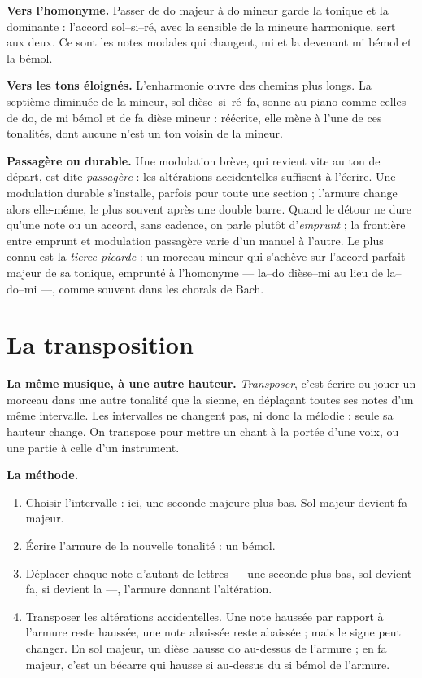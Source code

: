 \documentclass[a4paper,11pt]{article}
\begin{document}
\textbf{Vers l'homonyme.} Passer de do majeur à do mineur garde la tonique et
la dominante : l'accord sol--si--ré, avec la sensible de la mineure
harmonique, sert aux deux. Ce sont les notes modales qui changent, mi et la
devenant mi bémol et la bémol.

\textbf{Vers les tons éloignés.} L'enharmonie ouvre des chemins plus longs.
La septième diminuée de la mineur, sol dièse--si--ré--fa, sonne au piano comme
celles de do, de mi bémol et de fa dièse mineur : réécrite, elle mène à l'une
de ces tonalités, dont aucune n'est un ton voisin de la mineur.

\textbf{Passagère ou durable.} Une modulation brève, qui revient vite au ton
de départ, est dite \emph{passagère} : les altérations accidentelles suffisent
à l'écrire. Une modulation durable s'installe, parfois pour toute une section ;
l'armure change alors elle-même, le plus souvent après une double barre. Quand
le détour ne dure qu'une note ou un accord, sans cadence, on parle plutôt
d'\emph{emprunt} ; la frontière entre emprunt et modulation passagère varie
d'un manuel à l'autre. Le plus connu est la \emph{tierce picarde} : un morceau
mineur qui s'achève sur l'accord parfait majeur de sa tonique, emprunté à
l'homonyme --- la--do dièse--mi au lieu de la--do--mi ---, comme souvent dans
les chorals de Bach.

\section{La transposition}
\label{sec:transposition}

\textbf{La même musique, à une autre hauteur.} \emph{Transposer}, c'est écrire
ou jouer un morceau dans une autre tonalité que la sienne, en déplaçant toutes
ses notes d'un même intervalle. Les intervalles ne changent pas, ni donc la
mélodie : seule sa hauteur change. On transpose pour mettre un chant à la
portée d'une voix, ou une partie à celle d'un instrument.

\textbf{La méthode.}
\begin{enumerate}
  \item Choisir l'intervalle : ici, une seconde majeure plus bas. Sol majeur
    devient fa majeur.
  \item Écrire l'armure de la nouvelle tonalité : un bémol.
  \item Déplacer chaque note d'autant de lettres --- une seconde plus bas, sol
    devient fa, si devient la ---, l'armure donnant l'altération.
  \item Transposer les altérations accidentelles. Une note haussée par rapport
    à l'armure reste haussée, une note abaissée reste abaissée ; mais le signe
    peut changer. En sol majeur, un dièse hausse do au-dessus de l'armure ; en
    fa majeur, c'est un bécarre qui hausse si au-dessus du si bémol de
    l'armure.
\end{enumerate}
\end{document}
